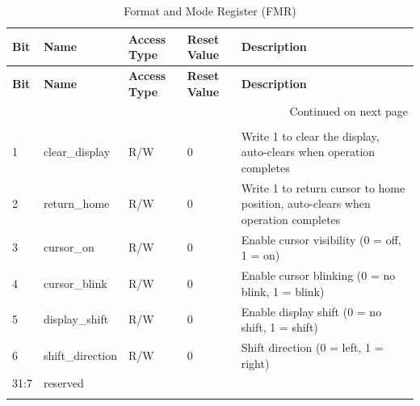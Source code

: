     \begin{longtable}{|p{1cm}|p{3cm}|p{2cm}|p{1cm}|p{6.25cm}|}
        \hline
        \textbf{Bit} & \textbf{Name} & \textbf{Access Type} & \textbf{Reset Value} & \textbf{Description} \\
        \hline
        \endfirsthead
        \hline
        \textbf{Bit} & \textbf{Name} & \textbf{Access Type} & \textbf{Reset Value} & \textbf{Description} \\
        \hline
        \endhead
        \hline \multicolumn{5}{|r|}{{Continued on next page}} \\ \hline
        \endfoot
        \hline
        \endlastfoot
        
        \multicolumn{5}{|c|}{\textbf{0x2C DFR - Display Format Register}} \\
        \hline
        1 & clear\_display & R/W & 0 & Write 1 to clear the display, auto-clears when operation completes \\
        \hline
        2 & return\_home & R/W & 0 & Write 1 to return cursor to home position, auto-clears when operation completes \\
        \hline
        3 & cursor\_on & R/W & 0 & Enable cursor visibility (0 = off, 1 = on) \\
        \hline
        4 & cursor\_blink & R/W & 0 & Enable cursor blinking (0 = no blink, 1 = blink) \\
        \hline
        5 & display\_shift & R/W & 0 & Enable display shift (0 = no shift, 1 = shift) \\
        \hline
        6 & shift\_direction & R/W & 0 & Shift direction (0 = left, 1 = right) \\
        \hline
        31:7 & reserved & & & \\
        \hline
        \caption{Format and Mode Register (FMR)}
        \label{tab:fmr}
        \end{longtable}